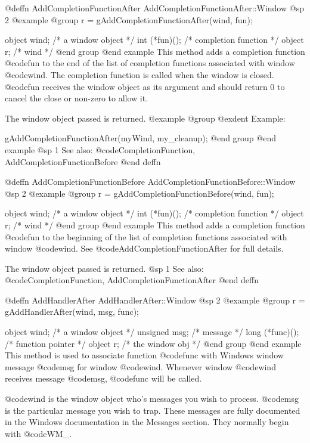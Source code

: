 @deffn {AddCompletionFunctionAfter} AddCompletionFunctionAfter::Window
@sp 2
@example
@group
r = gAddCompletionFunctionAfter(wind, fun);

object  wind;      /*  a window object     */
int    (*fun)();   /*  completion function  */
object  r;         /*  wind                */
@end group
@end example
This method adds a completion function @code{fun} to the end of the
list of completion functions associated with window @code{wind}.
The completion function is called when the window is closed.
@code{fun} receives the window object as its argument and should
return 0 to cancel the close or non-zero to allow it.

The window object passed is returned.
@example
@group
@exdent Example:

gAddCompletionFunctionAfter(myWind, my_cleanup);
@end group
@end example
@sp 1
See also:  @code{CompletionFunction, AddCompletionFunctionBefore}
@end deffn




@deffn {AddCompletionFunctionBefore} AddCompletionFunctionBefore::Window
@sp 2
@example
@group
r = gAddCompletionFunctionBefore(wind, fun);

object  wind;      /*  a window object     */
int    (*fun)();   /*  completion function  */
object  r;         /*  wind                */
@end group
@end example
This method adds a completion function @code{fun} to the beginning of
the list of completion functions associated with window @code{wind}.
See @code{AddCompletionFunctionAfter} for full details.

The window object passed is returned.
@sp 1
See also:  @code{CompletionFunction, AddCompletionFunctionAfter}
@end deffn




@deffn {AddHandlerAfter} AddHandlerAfter::Window
@sp 2
@example
@group
r = gAddHandlerAfter(wind, msg, func);

object   wind;     /*  a window object  */
unsigned msg;      /*  message          */
long    (*func)(); /*  function pointer */
object  r;         /*  the window obj   */
@end group
@end example
This method is used to associate function @code{func} with Windows window
message @code{msg} for window @code{wind}.  Whenever window @code{wind}
receives message @code{msg}, @code{func} will be called.

@code{wind} is the window object who's messages you wish to process.
@code{msg} is the particular message you wish to trap.  These messages
are fully documented in the Windows documentation in the Messages
section.  They normally begin with @code{WM_}.

